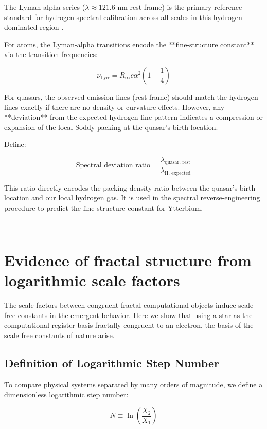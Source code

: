 \documentclass[11pt,a4paper]{article}
\begin{document}
    The Lyman-alpha series ($\lambda \approx 121.6$ nm rest frame) is the primary reference standard for hydrogen spectral calibration across all scales in this hydrogen dominated region .

    For atoms, the Lyman-alpha transitions encode the **fine-structure constant** via the transition frequencies:

    \[
    \nu_{\text{Ly}\alpha} = R_\infty c \alpha^2 \left(1 - \frac{1}{4}\right)
    \]

    For quasars, the observed emission lines (rest-frame) should match the hydrogen lines exactly if there are no density or curvature effects. However, any **deviation** from the expected hydrogen line pattern indicates a compression or expansion of the local Soddy packing at the quasar's birth location.

    Define:

    \[
    \text{Spectral deviation ratio} = \frac{\lambda_{\text{quasar, rest}}}{\lambda_{\text{H, expected}}}
    \]

    This ratio directly encodes the packing density ratio between the quasar's birth location and our local hydrogen gas. It is used in the spectral reverse-engineering procedure to predict the fine-structure constant for Ytterbium.

---


\section{Evidence of fractal structure from logarithmic scale factors}

  The scale factors between congruent fractal computational objects induce scale free constants in the emergent behavior. Here we show that using a star as the computational register basis fractally congruent to an electron, the basis of the scale free constants of nature arise.

  \subsection{Definition of Logarithmic Step Number}

    To compare physical systems separated by many orders of magnitude, we define a dimensionless logarithmic step number:

    \[
    N \equiv \ln\left(\frac{X_2}{X_1}\right)
    \]
\end{document}
